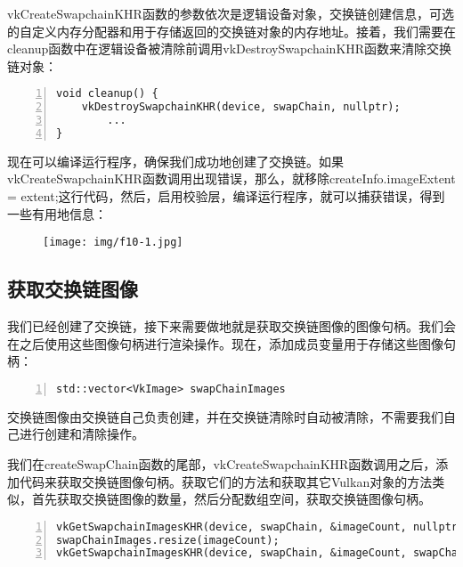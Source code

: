 \documentclass{ctexart}
\begin{document}
vkCreateSwapchainKHR函数的参数依次是逻辑设备对象，交换链创建信息，可选的自定义内存分配器和用于存储返回的交换链对象的内存地址。接着，我们需要在cleanup函数中在逻辑设备被清除前调用vkDestroySwapchainKHR函数来清除交换链对象：

\begin{lstlisting}[language={[ANSI]C},keywordstyle=\color{blue!70},commentstyle=\color{red!50!green!50!blue!50},frame=shadowbox, rulesepcolor=\color{red!20!green!20!blue!20},basicstyle=\small,numbers=left, numberstyle=\tiny,breaklines=true]
void cleanup() {
	vkDestroySwapchainKHR(device, swapChain, nullptr);
		...
}
\end{lstlisting}

现在可以编译运行程序，确保我们成功地创建了交换链。如果vkCreateSwapchainKHR函数调用出现错误，那么，就移除createInfo.imageExtent = extent;这行代码，然后，启用校验层，编译运行程序，就可以捕获错误，得到一些有用地信息：

\begin{figure}[H]
	\centering
	\texttt{[image: img/f10-1.jpg]}
\end{figure}

\subsection{获取交换链图像}

我们已经创建了交换链，接下来需要做地就是获取交换链图像的图像句柄。我们会在之后使用这些图像句柄进行渲染操作。现在，添加成员变量用于存储这些图像句柄：

\begin{lstlisting}[language={[ANSI]C},keywordstyle=\color{blue!70},commentstyle=\color{red!50!green!50!blue!50},frame=shadowbox, rulesepcolor=\color{red!20!green!20!blue!20},basicstyle=\small,numbers=left, numberstyle=\tiny,breaklines=true]
std::vector<VkImage> swapChainImages
\end{lstlisting}

交换链图像由交换链自己负责创建，并在交换链清除时自动被清除，不需要我们自己进行创建和清除操作。

我们在createSwapChain函数的尾部，vkCreateSwapchainKHR函数调用之后，添加代码来获取交换链图像句柄。获取它们的方法和获取其它Vulkan对象的方法类似，首先获取交换链图像的数量，然后分配数组空间，获取交换链图像句柄。

\begin{lstlisting}[language={[ANSI]C},keywordstyle=\color{blue!70},commentstyle=\color{red!50!green!50!blue!50},frame=shadowbox, rulesepcolor=\color{red!20!green!20!blue!20},basicstyle=\small,numbers=left, numberstyle=\tiny,breaklines=true]
vkGetSwapchainImagesKHR(device, swapChain, &imageCount, nullptr);
swapChainImages.resize(imageCount);
vkGetSwapchainImagesKHR(device, swapChain, &imageCount, swapChainImages.data());
\end{lstlisting}
\end{document}
